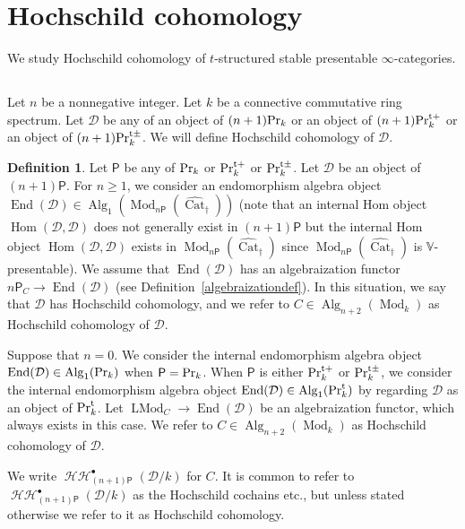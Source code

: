 \documentclass[leqno,12pt]{amsart}
\theoremstyle{plain}
\theoremstyle{definition}
\newtheorem{Definition}[Theorem]{Definition}
\newcommand{\HH}{\operatorname{\mathcal{HH}}}
\newcommand{\DDD}{\mathcal{D}}
\newcommand{\PR}{\textup{Pr}}
\newcommand{\PRT}{\textup{Pr}^{\textup{t}}}
\newcommand{\PRTT}{\textup{Pr}^{\textup{t}+}}
\newcommand{\PRTTT}{\textup{Pr}^{\textup{t}\pm}}
\newcommand{\Hom}{\operatorname{Hom}}
\newcommand{\Mod}{\operatorname{Mod}}
\newcommand{\Alg}{\operatorname{Alg}}
\newcommand{\End}{\operatorname{End}}
\newcommand{\vCat}{\widehat{\operatorname{Cat}}_\dagger}
\newcommand{\LMod}{\operatorname{LMod}}
\begin{document}
\section{Hochschild cohomology}


\label{hochsec}

We study Hochschild cohomology of $t$-structured stable presentable $\infty$-categories.


\subsection{}



Let $n$ be a nonnegative integer. Let $k$ be a connective commutative ring spectrum.
Let $\DDD$ be any of an object of $(n+1)\PR_k$ or an object of $(n+1)\PRTT_k$ or an object of $(n+1)\PRTTT_k$.
We will define Hochschild cohomology of $\DDD$.

\begin{Definition}
\label{Hochschilddef}
Let $\mathsf{P}$ be any of $\PR_k$ or $\PRTT_k$ or $\PRTTT_k$.
Let $\DDD$ be an object of $(n+1)\mathsf{P}$.
For $n\ge1$, we consider an endomorphism algebra object $\End(\DDD)\in \Alg_1(\Mod_{n\mathsf{P}}(\vCat))$
(note that an internal Hom object $\Hom(\DDD,\DDD)$ does not generally exist in $(n+1)\mathsf{P}$ 
but the internal Hom object $\Hom(\DDD,\DDD)$ exists in $\Mod_{n\mathsf{P}}(\vCat)$ since $\Mod_{n\mathsf{P}}(\vCat)$ is $\mathbb{V}$-presentable).
We assume that $\End(\DDD)$ has an algebraization functor $n\mathsf{P}_C\to \End(\DDD)$ (see Definition~\ref{algebraizationdef}).
In this situation, we say that $\DDD$ has Hochschild cohomology, and
we refer to $C\in \Alg_{n+2}(\Mod_k)$ as Hochschild cohomology of $\DDD$.

Suppose that $n=0$. We consider the internal endomorphism algebra object $\End(\DDD)\in \Alg_1(\PR_k)$ when $\mathsf{P}=\PR_k$.
When $\mathsf{P}$ is either $\PRTT_k$ or $\PRTTT_k$, we consider the internal endomorphism algebra object $\End(\DDD)\in \Alg_1(\PRT_k)$ 
by regarding $\DDD$ as an object of $\PRT_k$.
Let $\LMod_C\to \End(\DDD)$ be an algebraization functor, which always exists in this case.
We refer to $C\in \Alg_{n+2}(\Mod_k)$ as Hochschild cohomology of $\DDD$.


We write $\HH^\bullet_{(n+1)\mathsf{P}}(\DDD/k)$ for $C$.
It is common to refer to $\HH^\bullet_{(n+1)\mathsf{P}}(\DDD/k)$ as the Hochschild cochains etc., but unless stated otherwise
we refer to it as Hochschild cohomology.
\end{Definition}
\end{document}
